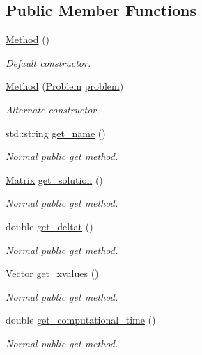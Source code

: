 \subsection*{Public Member Functions}
\begin{DoxyCompactItemize}
\item 
\hyperlink{classMethod_ab48717dc68d3c057b65574a539a480f7}{Method} ()
\begin{DoxyCompactList}\small\item\em Default constructor. \end{DoxyCompactList}\item 
\hyperlink{classMethod_ad27fe6ae65cd4571d52cba8562b16222}{Method} (\hyperlink{classProblem}{Problem} \hyperlink{classMethod_a29a08a679b5d30a8c813766308205041}{problem})
\begin{DoxyCompactList}\small\item\em Alternate constructor. \end{DoxyCompactList}\item 
std\+::string \hyperlink{classMethod_a103a9b2dcf6ef35857e279ba1e5ef9c3}{get\+\_\+name} ()
\begin{DoxyCompactList}\small\item\em Normal public get method. \end{DoxyCompactList}\item 
\hyperlink{classMatrix}{Matrix} \hyperlink{classMethod_a2a10100e81e4aca97f7ef485ed11fbe6}{get\+\_\+solution} ()
\begin{DoxyCompactList}\small\item\em Normal public get method. \end{DoxyCompactList}\item 
double \hyperlink{classMethod_a45b9b0d41d353381a6725323e5be6281}{get\+\_\+deltat} ()
\begin{DoxyCompactList}\small\item\em Normal public get method. \end{DoxyCompactList}\item 
\hyperlink{classVector}{Vector} \hyperlink{classMethod_aeda95af3c0440df84c0571614f6fd122}{get\+\_\+xvalues} ()
\begin{DoxyCompactList}\small\item\em Normal public get method. \end{DoxyCompactList}\item 
double \hyperlink{classMethod_a0ad41fa7e54a46dc97b73187a8dcba4d}{get\+\_\+computational\+\_\+time} ()
\begin{DoxyCompactList}\small\item\em Normal public get method. \end{DoxyCompactList}\item 

\end{DoxyCompactItemize}
